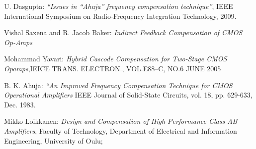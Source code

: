 \begin{thebibliography}{}


	U. Dasgupta: \textit{“Issues in “Ahuja” frequency compensation technique”}, IEEE International Symposium on Radio-Frequency Integration Technology, 2009.


	Vishal Saxena and R. Jacob Baker: \textit{Indirect Feedback Compensation of CMOS Op-Amps}




	Mohammad Yavari: \textit{Hybrid Cascode Compensation for Two-Stage CMOS Opamps},IEICE TRANS. ELECTRON., VOL.E88–C, NO.6 JUNE 2005



	B. K. Ahuja: \textit{“An Improved Frequency Compensation Technique for CMOS Operational Amplifiers} IEEE Journal of Solid-State Circuits, vol. 18, pp. 629-633, Dec. 1983.



	Mikko Loikkanen: \textit{Design and Compensation of High Performance Class AB Amplifiers}, Faculty of Technology, Department of Electrical and Information Engineering, University of Oulu;



\end{thebibliography}



        \newpage
        \null 
        \thispagestyle{empty} 
        \newpage
        
        \newpage
        \null 
        \thispagestyle{empty} 
        \newpage
